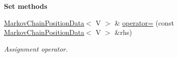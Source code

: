 \begin{Indent}{\bf Set methods}\par
\begin{DoxyCompactItemize}
\item 
\hyperlink{class_q_u_e_s_o_1_1_markov_chain_position_data}{Markov\-Chain\-Position\-Data}$<$ V $>$ \& \hyperlink{class_q_u_e_s_o_1_1_markov_chain_position_data_aa3608d527f0215fe772aa9f9e1686dd8}{operator=} (const \hyperlink{class_q_u_e_s_o_1_1_markov_chain_position_data}{Markov\-Chain\-Position\-Data}$<$ V $>$ \&rhs)
\begin{DoxyCompactList}\small\item\em Assignment operator. \end{DoxyCompactList}\end{DoxyCompactItemize}
\end{Indent}
